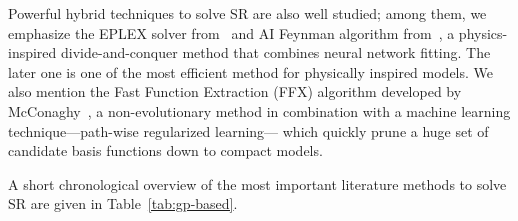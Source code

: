 \documentclass[a4paper,12pt]{elsarticle}
\begin{document}
	Powerful hybrid techniques to solve SR are also well studied; among them, we emphasize the EPLEX solver from~\cite{la2019probabilistic,la2016epsilon} and AI Feynman algorithm from~\cite{udrescu2020ai}, a physics-inspired divide-and-conquer method that  combines neural network
	fitting. The later one is one of the most efficient method for physically inspired models. We also mention the Fast Function Extraction (FFX) algorithm developed by McConaghy~\cite{mcconaghy2011ffx},  a non-evolutionary method in combination with a machine learning technique---path-wise regularized learning--- which   quickly prune a huge set of candidate basis functions down to compact models.
	
	A short chronological overview of the most important  literature methods to solve SR are given in Table~\ref{tab:gp-based}. 
	
\end{document}
